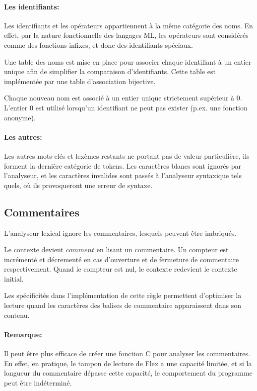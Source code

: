 \documentclass[paper=a4, fontsize=11pt]{scrartcl}
\numberwithin{equation}{section}		%
\numberwithin{figure}{section}			%
\numberwithin{table}{section}				%
\begin{document}
\paragraph{Les identifiants:}
Les identifiants et les opérateurs appartiennent à la même catégorie des noms.
En effet, par la nature fonctionnelle des langages ML, les opérateurs sont considérés comme des fonctions infixes, et donc des identifiants spéciaux.

Une table des noms est mise en place pour associer chaque identifiant à un entier unique afin de simplifier la comparaison d'identifiants. Cette table est implémentée par une table d'association bijective.

Chaque nouveau nom est associé à un entier unique strictement supérieur à $0$. L'entier $0$ est utilisé lorsqu'un identifiant ne peut pas exister (p.ex. une fonction anonyme).

\paragraph{Les autres:}
Les autres mots-clés et lexèmes restants ne portant pas de valeur particulière, ils forment la dernière catégorie de tokens.
Les caractères blancs sont ignorés par l'analyseur, et les caractères invalides sont passés à l'analyseur syntaxique tels quels, où ils provoqueront une erreur de syntaxe.

\subsection{Commentaires}
L'analyseur lexical ignore les commentaires, lesquels peuvent être imbriqués.

Le contexte devient $comment$ en lisant un commentaire.
Un compteur est incrémenté et décrementé en cas d'ouverture et de fermeture de commentaire respectivement.
Quand le compteur est nul, le contexte redevient le contexte initial.

Les spécificités dans l'implémentation de cette règle permettent d'optimiser la lecture quand les caractères des balises de commentaire apparaissent dans son contenu.

\begin{small}
\paragraph{Remarque:}
Il peut être plus efficace de créer une fonction C pour analyser les commentaires.
En effet, en pratique, le tampon de lecture de Flex a une capacité limitée, et si la longueur du commentaire dépasse cette capacité, le comportement du programme peut être indéterminé.
\end{small}
\end{document}
